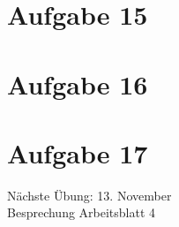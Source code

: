 \documentclass[9pt,german]{beamer}%
\begin{document}
\section{Aufgabe 15}

\section{Aufgabe 16}

\section{Aufgabe 17}



\begin{frame}
\centering
\Huge{}
\vspace{2cm}

{\LARGE
N\"achste \"Ubung: 13. November\\
Besprechung Arbeitsblatt 4
}
\end{frame}


\end{document}
